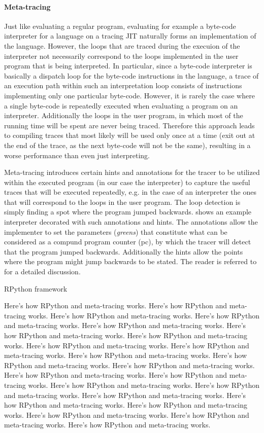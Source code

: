 \paragraph{Meta-tracing}
Just like evaluating a regular program, evaluating for example a
byte-code interpreter for a language on a tracing JIT naturally forms
an implementation of the language. However, the loops that are traced
during the execuion of the interpreter not necessarily correspond to
the loops implemented in the user program that is being
interpreted. In particular, since a byte-code interpreter is basically
a dispatch loop for the byte-code instructions in the language, a
trace of an execution path within such an interpretation loop consists
of instructions implementing only one particular byte-code. However,
it is rarely the case where a single byte-code is repeatedly executed
when evaluating a program on an interpreter. Additionally the loops in
the user program, in which most of the running time will be spent are
never being traced. Therefore this approach leads to compiling traces
that most likely will be used only once at a time (exit out at the end
of the trace, as the next byte-code will not be the same),
resulting in a worse performance than even just interpreting.

Meta-tracing introduces certain hints and annotations for the tracer
to be utilized within the executed program (in our case the
interpreter) to capture the useful traces that will be executed
repeatedly, e.g. in the case of an interpreter the ones that will
correspond to the loops in the user program. The loop detection is
simply finding a spot where the program jumped
backwards.  shows an example interpreter
decorated with such annotations and hints. The annotations allow the
implementer to set the parameters (\emph{greens}) that constitute what
can be considered as a compund program counter (pc), by which the
tracer will detect that the program jumped backwards. Additionally the
hints allow the points where the program might jump backwards to be
stated.  The reader is referred to \cite{bolz09} for a detailed
discussion.

RPython framework


Here's how RPython and meta-tracing works. Here's how RPython and meta-tracing works. Here's how RPython and meta-tracing works. Here's how RPython and meta-tracing works. Here's how RPython and meta-tracing works. Here's how RPython and meta-tracing works. Here's how RPython and meta-tracing works. Here's how RPython and meta-tracing works. Here's how RPython and meta-tracing works. Here's how RPython and meta-tracing works. Here's how RPython and meta-tracing works. Here's how RPython and meta-tracing works. Here's how RPython and meta-tracing works. Here's how RPython and meta-tracing works. Here's how RPython and meta-tracing works. Here's how RPython and meta-tracing works. Here's how RPython and meta-tracing works. Here's how RPython and meta-tracing works. Here's how RPython and meta-tracing works. Here's how RPython and meta-tracing works. Here's how RPython and meta-tracing works. Here's how RPython and meta-tracing works.

